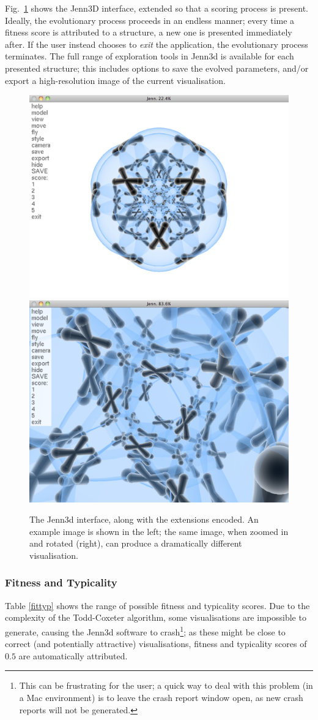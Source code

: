 \documentclass{article}
\begin{document}
Fig.~\ref{interface} shows the Jenn3D interface, extended so that a scoring
process is present. Ideally, the evolutionary process proceeds in an endless
manner; every time a fitness score is attributed to a structure, a new one is
presented immediately after. If the user instead chooses to \textit{exit} the
application, the evolutionary process terminates. The full range of exploration
tools in Jenn3d is available for each presented structure; this includes
options to save the evolved parameters, and/or export a high-resolution image
of the current visualisation.

\begin{figure}[ht]
	\begin{center}
		\includegraphics[width = .48\textwidth]{jennInterface1}
		\includegraphics[width = .48\textwidth]{jennInterface2}
	\end{center}
	\caption{The Jenn3d interface, along with the extensions encoded. An
	example image is shown in the left; the same image, when zoomed in
	and rotated (right), can produce a dramatically different
	visualisation.}
	\label{interface}
\end{figure}

\subsubsection{Fitness and Typicality}

Table \ref{fittyp} shows the range of possible fitness and typicality scores.
Due to the complexity of the Todd-Coxeter algorithm, some visualisations are
impossible to generate, causing the Jenn3d software to crash\footnote{This can
be frustrating for the user; a quick way to deal with this problem (in a Mac
environment) is to leave the crash report window open, as new crash reports
will not be generated.}; as these might be close to correct (and potentially
attractive) visualisations, fitness and typicality scores of $0.5$ are
automatically attributed.
\end{document}
